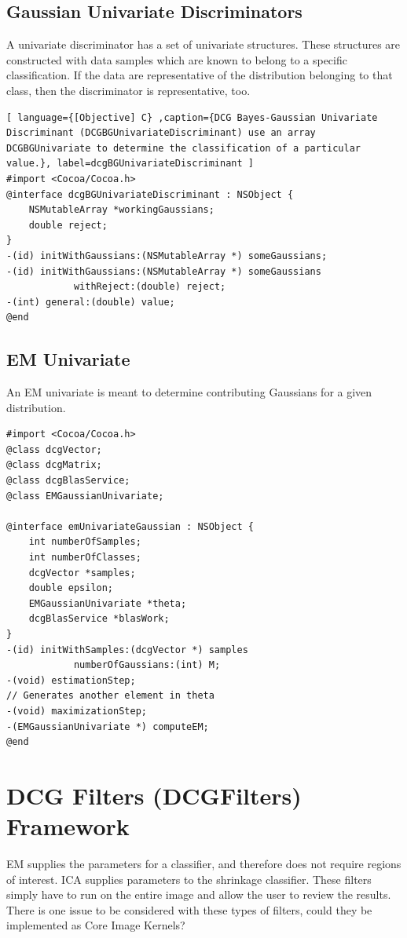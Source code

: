 \documentclass[12pt]{report}
\begin{document}
\subsection{Gaussian Univariate Discriminators}
A univariate discriminator has a set of univariate structures.  These structures are constructed with data samples which are known to belong to a specific classification.  If the data are representative of the distribution belonging to that class, then the discriminator is representative, too. 
\begin{lstlisting}[ language={[Objective] C} ,caption={DCG Bayes-Gaussian Univariate Discriminant (DCGBGUnivariateDiscriminant) use an array DCGBGUnivariate to determine the classification of a particular value.}, label=dcgBGUnivariateDiscriminant ] 
#import <Cocoa/Cocoa.h>
@interface dcgBGUnivariateDiscriminant : NSObject {
	NSMutableArray *workingGaussians;
	double reject;
}
-(id) initWithGaussians:(NSMutableArray *) someGaussians;
-(id) initWithGaussians:(NSMutableArray *) someGaussians
			withReject:(double) reject;
-(int) general:(double) value;
@end
\end{lstlisting}

\subsection{EM Univariate}
An EM univariate is meant to determine contributing Gaussians for a given distribution.  

\begin{lstlisting}
#import <Cocoa/Cocoa.h>
@class dcgVector;
@class dcgMatrix;
@class dcgBlasService;
@class EMGaussianUnivariate;

@interface emUnivariateGaussian : NSObject {
	int numberOfSamples;
	int numberOfClasses;
	dcgVector *samples;
	double epsilon;
	EMGaussianUnivariate *theta;
	dcgBlasService *blasWork;
}
-(id) initWithSamples:(dcgVector *) samples
			numberOfGaussians:(int) M;
-(void) estimationStep;
// Generates another element in theta
-(void) maximizationStep;
-(EMGaussianUnivariate *) computeEM;
@end
\end{lstlisting}


\section{DCG Filters (DCGFilters) Framework}

EM supplies the parameters for a classifier, and therefore does not require regions of interest.   ICA supplies parameters to the shrinkage classifier.   These filters simply have to run on the entire image and allow the user to review the results.  There is one issue to be considered with these types of filters, could they be implemented as Core Image Kernels?   
\end{document}
